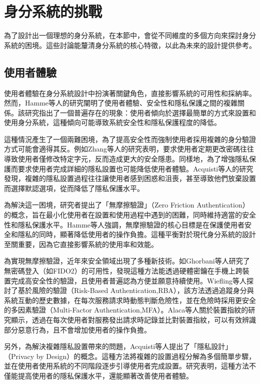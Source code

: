 \section{身分系統的挑戰}
為了設計出一個理想的身分系統，在本節中，會從不同維度的多個方向來探討身分系統的困境。這些討論能釐清身分系統的核心特徵，以此為未來的設計提供參考。
\subsection{使用者體驗}
使用者體驗在身分系統設計中扮演著關鍵角色，直接影響系統的可用性和採納率。然而，Hamme等人\cite{inproceedings}的研究闡明了使用者體驗、安全性和隱私保護之間的複雜關係。該研究指出了一個普遍存在的現象：使用者傾向於選擇最簡單的方式來設置和使用身分系統，這種傾向可能導致系統安全性和隱私保護程度的降低。

這種情況產生了一個兩難困境，為了提高安全性而強制使用者採用複雜的身分驗證方式可能會適得其反。例如Zhang等人\cite{zhang2010security}的研究表明，要求使用者定期更改密碼往往導致使用者僅修改特定字元，反而造成更大的安全隱患。同樣地，為了增強隱私保護而要求使用者完成詳細的隱私設置也可能降低使用者體驗。Acquisti等人\cite{acquisti2017nudges}的研究發現，複雜的隱私設置過程往往讓使用者感到困惑和沮喪，甚至導致他們放棄設置而選擇默認選項，從而降低了隱私保護水平。

為解決這一困境，研究者提出了「無摩擦驗證」（Zero Friction Authentication）的概念，旨在最小化使用者在設置和使用過程中遇到的困難，同時維持適當的安全性和隱私保護水平。Hamme等人\cite{inproceedings}強調，無摩擦驗證的核心目標是在保護使用者安全和隱私的同時，顯著降低使用者的操作負擔。這種平衡對於現代身分系統的設計至關重要，因為它直接影響系統的使用率和效能。

為實現無摩擦驗證，近年來安全領域出現了多種新技術。如Ghorbani等人\cite{ghorbani2020fido2}研究了無密碼登入（如FIDO2）的可用性，發現這種方法能透過硬體密鑰在手機上跨裝置完成高安全性的驗證，且使用者普遍認為方便並願意持續使用。Wiefling等人\cite{wiefling2021rba}探討了基於風險的驗證（Risk-Based Authentication,RBA），該方法透過追蹤身分與系統互動的歷史數據，在每次服務請求時動態判斷危險性，並在危險時採用更安全的多因素驗證（Multi-Factor Authentication,MFA）\cite{bonneau2012mfa}。Alaca等人\cite{alaca2016devicefingerprinting}關於裝置指紋的研究顯示，透過在每次使用者對服務發出請求時記錄並比對裝置指紋，可以有效辨識部分惡意行為，且不會增加使用者的操作負擔。

另外，為解決複雜隱私設置帶來的問題，Acquisti等人\cite{acquisti2017nudges}提出了「隱私設計」（Privacy by Design）的概念。這種方法將複雜的設置過程分解為多個簡單步驟，並在使用者使用系統的不同階段逐步引導使用者完成設置。研究表明，這種方法不僅能提高使用者的隱私保護水平，還能顯著改善使用者體驗。

